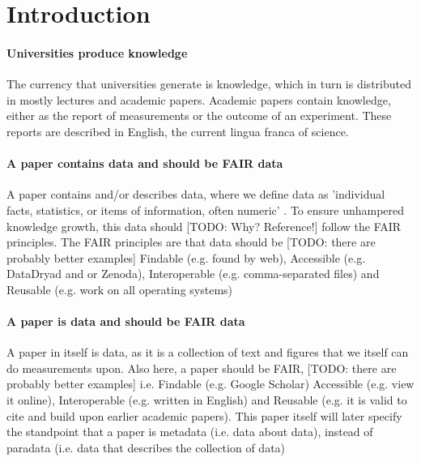 \section{Introduction}


\paragraph{Universities produce knowledge}

The currency that universities generate is knowledge, which in turn is distributed
in mostly lectures and academic papers.
Academic papers contain knowledge, either as the
report of measurements or the outcome of an experiment.
These reports are described in English, the current lingua franca of science.

\paragraph{A paper contains data and should be FAIR data}

A paper contains and/or describes data, where we define
data as 'individual facts, statistics, or items of information, often 
numeric' \cite{glossary2003oecd}.
To ensure unhampered knowledge growth, this data should [TODO: Why? Reference!] 
follow the FAIR 
principles.
The FAIR principles \cite{wilkinson2016fair} are that data should be 
[TODO: there are probably better examples]
Findable (e.g. found by web),
Accessible (e.g. DataDryad and or Zenoda), 
Interoperable (e.g. comma-separated files) 
and Reusable (e.g. work on all operating systems)

\paragraph{A paper is data and should be FAIR data}

A paper in itself is data, as it is a collection of text and
figures that we itself can do measurements upon.
Also here, a paper should be FAIR, 
[TODO: there are probably better examples]
i.e.
Findable (e.g. Google Scholar)
Accessible (e.g. view it online), 
Interoperable (e.g. written in English)
and Reusable (e.g. it is valid to cite and build upon earlier academic papers).
This paper itself will later specify the standpoint that a paper
is metadata (i.e. data about data), instead of paradata (i.e.
data that describes the collection of data)

